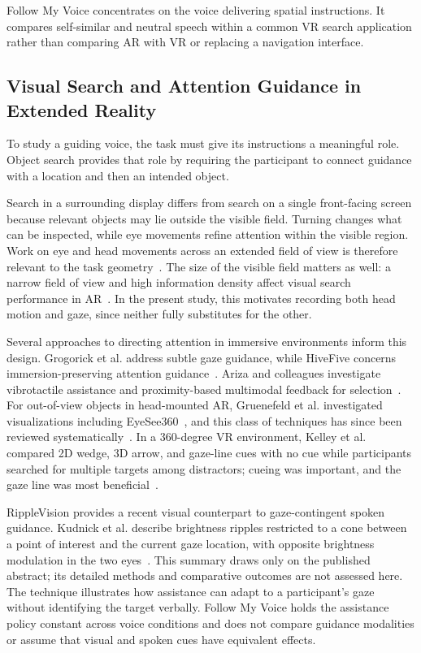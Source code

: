 Follow My Voice concentrates on the voice delivering spatial instructions. It compares self-similar and neutral speech within a common VR search application rather than comparing AR with VR or replacing a navigation interface.

\subsection{Visual Search and Attention Guidance in Extended Reality}
To study a guiding voice, the task must give its instructions a meaningful role. Object search provides that role by requiring the participant to connect guidance with a location and then an intended object.

Search in a surrounding display differs from search on a single front-facing screen because relevant objects may lie outside the visible field. Turning changes what can be inspected, while eye movements refine attention within the visible region. Work on eye and head movements across an extended field of view is therefore relevant to the task geometry~\cite{stein2024eyehead}. The size of the visible field matters as well: a narrow field of view and high information density affect visual search performance in AR~\cite{trepkowski2019fov}. In the present study, this motivates recording both head motion and gaze, since neither fully substitutes for the other.

Several approaches to directing attention in immersive environments inform this design. Grogorick et al. address subtle gaze guidance, while HiveFive concerns immersion-preserving attention guidance~\cite{grogorick2017subtle,lange2020hivefive}. Ariza and colleagues investigate vibrotactile assistance and proximity-based multimodal feedback for selection~\cite{ariza2017vibrotactile,ariza2018proximity}. For out-of-view objects in head-mounted AR, Gruenefeld et al. investigated visualizations including EyeSee360~\cite{gruenefeld2017eyesee360}, and this class of techniques has since been reviewed systematically~\cite{quinn2024review}. In a 360-degree VR environment, Kelley et al. compared 2D wedge, 3D arrow, and gaze-line cues with no cue while participants searched for multiple targets among distractors; cueing was important, and the gaze line was most beneficial~\cite{kelley2025cueing}.

RippleVision provides a recent visual counterpart to gaze-contingent spoken guidance. Kudnick et al. describe brightness ripples restricted to a cone between a point of interest and the current gaze location, with opposite brightness modulation in the two eyes~\cite{kudnick2026ripplevision}. This summary draws only on the published abstract; its detailed methods and comparative outcomes are not assessed here. The technique illustrates how assistance can adapt to a participant's gaze without identifying the target verbally. Follow My Voice holds the assistance policy constant across voice conditions and does not compare guidance modalities or assume that visual and spoken cues have equivalent effects.

